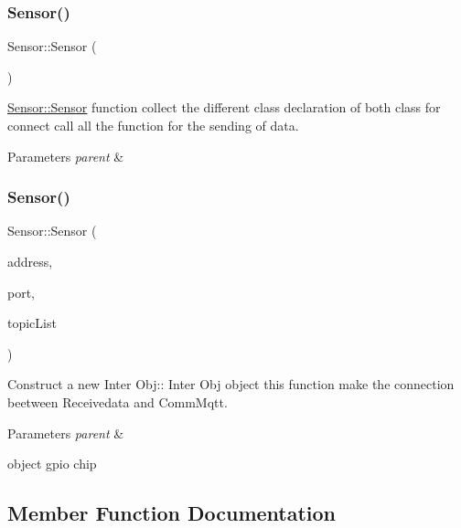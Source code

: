 \subsubsection{\texorpdfstring{Sensor()}{Sensor()}\hspace{0.1cm}{\footnotesize\ttfamily [1/2]}}
{\footnotesize\ttfamily Sensor\+::\+Sensor (\begin{DoxyParamCaption}{ }\end{DoxyParamCaption})}



\hyperlink{classSensor_a342d6d11ef572c8cba92cb76fb1a294b}{Sensor\+::\+Sensor} function collect the different class declaration of both class for connect call all the function for the sending of data. 


\begin{DoxyParams}{Parameters}
{\em parent} & \\
\hline
\end{DoxyParams}
\mbox{\label{classSensor_a03d3f7e3089eaceba93b485c57e3b21d}} 
\subsubsection{\texorpdfstring{Sensor()}{Sensor()}\hspace{0.1cm}{\footnotesize\ttfamily [2/2]}}
{\footnotesize\ttfamily Sensor\+::\+Sensor (\begin{DoxyParamCaption}\item[{Q\+String}]{address,  }\item[{quint16}]{port,  }\item[{Q\+List$<$ Q\+String $>$}]{topic\+List }\end{DoxyParamCaption})}



Construct a new Inter Obj\+:\+: Inter Obj object this function make the connection beetween Receivedata and Comm\+Mqtt. 


\begin{DoxyParams}{Parameters}
{\em parent} & \\
\hline
\end{DoxyParams}
object gpio chip 

\subsection{Member Function Documentation}
\mbox{\label{classSensor_adead6577984a7d6b765897ba001ed176}} 
